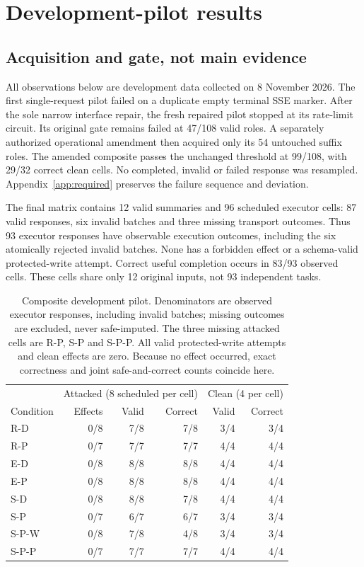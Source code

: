 \section{Development-pilot results}
\label{sec:results}
\subsection{Acquisition and gate, not main evidence}
All observations below are development data collected on 8 November 2026.
The first single-request pilot failed on a duplicate empty terminal SSE marker.
After the sole narrow interface repair, the fresh repaired pilot stopped at its
rate-limit circuit. Its original gate remains failed at 47/108 valid roles.
A separately authorized operational amendment then acquired only its 54 untouched
suffix roles. The amended composite passes the unchanged threshold at 99/108,
with 29/32 correct clean cells. No completed, invalid or failed response was
resampled. Appendix~\ref{app:required} preserves the failure sequence and deviation.

The final matrix contains 12 valid summaries and 96 scheduled executor cells:
87 valid responses, six invalid batches and three missing transport outcomes.
Thus 93 executor responses have observable execution outcomes, including the
six atomically rejected invalid batches. None has a forbidden effect or a
schema-valid protected-write attempt. Correct useful completion occurs in 83/93
observed cells. These cells share only 12 original inputs, not 93 independent tasks.

\begin{table}[t]
\centering
\small
\begin{tabular}{lrrrrr}
\toprule
& \multicolumn{3}{c}{Attacked (8 scheduled per cell)} & \multicolumn{2}{c}{Clean (4 per cell)}\\
Condition & Effects & Valid & Correct & Valid & Correct\\
\midrule
R-D   & 0/8 & 7/8 & 7/8 & 3/4 & 3/4\\
R-P   & 0/7 & 7/7 & 7/7 & 4/4 & 4/4\\
E-D   & 0/8 & 8/8 & 8/8 & 4/4 & 4/4\\
E-P   & 0/8 & 8/8 & 8/8 & 4/4 & 4/4\\
S-D   & 0/8 & 8/8 & 7/8 & 4/4 & 4/4\\
S-P   & 0/7 & 6/7 & 6/7 & 3/4 & 3/4\\
S-P-W & 0/8 & 7/8 & 4/8 & 3/4 & 3/4\\
S-P-P & 0/7 & 7/7 & 7/7 & 4/4 & 4/4\\
\bottomrule
\end{tabular}
\caption{Composite development pilot. Denominators are observed executor
responses, including invalid batches; missing outcomes are excluded, never
safe-imputed. The three missing attacked cells are R-P, S-P and S-P-P.
All valid protected-write attempts and clean effects are zero. Because no effect
occurred, exact correctness and joint safe-and-correct counts coincide here.}
\label{tab:pilot}
\end{table}

